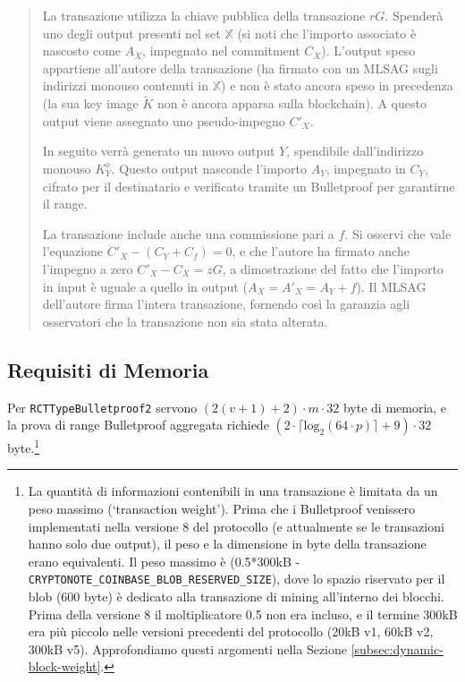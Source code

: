 \begin{quote}
La transazione utilizza la chiave pubblica della transazione $rG$. Spenderà uno degli output presenti nel set $\mathbb{X}$ (si noti che l’importo associato è nascosto come $A_X$, impegnato nel commitment $C_X$). L’output speso appartiene all'autore della transazione (ha firmato con un MLSAG sugli indirizzi monouso contenuti in $\mathbb{X}$) e non è stato ancora speso in precedenza (la sua key image $\tilde{K}$ non è ancora apparsa sulla blockchain). A questo output viene assegnato uno pseudo-impegno $C'_X$.

In seguito verrà generato un nuovo output $Y$, spendibile dall’indirizzo monouso $K^o_Y$. Questo output nasconde l’importo $A_Y$, impegnato in $C_Y$, cifrato per il destinatario e verificato tramite un Bulletproof per garantirne il range.

La transazione include anche una commissione pari a $f$. Si osservi che vale l’equazione $C'_X - (C_Y + C_f) = 0$, e che l'autore ha firmato anche l’impegno a zero $C'_X - C_X = zG$, a dimostrazione del fatto che l’importo in input è uguale a quello in output ($A_X = A'_X = A_Y + f$). Il MLSAG dell'autore firma l’intera transazione, fornendo così la garanzia agli osservatori che la transazione non sia stata alterata.
\end{quote}


\newpage
\subsection{Requisiti di Memoria}

Per {\tt RCTTypeBulletproof2} servono $(2(v+1)+2) \cdot m \cdot 32$ byte di memoria, e la prova di range Bulletproof aggregata richiede $(2 \cdot \lceil \textrm{log}_2(64 \cdot p) \rceil + 9) \cdot 32$ byte.\footnote{La quantità di informazioni contenibili in una transazione è limitata da un peso massimo (`transaction weight'). Prima che i Bulletproof venissero implementati nella versione 8 del protocollo (e attualmente se le transazioni hanno solo due output), il peso e la dimensione in byte della transazione erano equivalenti. Il peso massimo è (0.5*300kB - {\tt CRYPTONOTE\_COINBASE\_BLOB\_RESERVED\_SIZE}), dove lo spazio riservato per il blob (600 byte) è dedicato alla transazione di mining all’interno dei blocchi. Prima della versione 8 il moltiplicatore 0.5 non era incluso, e il termine 300kB era più piccolo nelle versioni precedenti del protocollo (20kB v1, 60kB v2, 300kB v5). Approfondiamo questi argomenti nella Sezione \ref{subsec:dynamic-block-weight}.}

